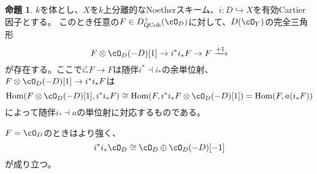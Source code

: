 \documentclass[uplatex, a4paper, dvipdfmx]{jsarticle}
\theoremstyle{definition}
\newtheorem{proposition}[theorem]{命題}
\DeclareMathOperator{\Hom}{\mathrm{Hom}}
\DeclareMathOperator{\QCoh}{\mathrm{QCoh}}
\begin{document}
\begin{proposition}
    $k$を体とし、$X$を$k$上分離的なNoetherスキーム、$i \colon D \hookrightarrow X$を有効Cartier因子とする。
    このとき任意の$F \in D_{\QCoh}^+(\cO_D)$に対して、$D(\cO_Y)$の完全三角形
    \begin{equation}
        F \otimes \cO_D(-D)[1] \to i^*i_*F \to F \xrightarrow{+1}
    \end{equation}
    が存在する。ここで$i^i_*F \to F$は随伴$i^* \dashv i_*$の余単位射、$F \otimes \cO_D(-D)[1] \to i^*i_*F$は
    \begin{equation}
        \Hom(F \otimes \cO_D(-D)[1], i^*i_*F) \cong \Hom(F, i^*i_*F\otimes \cO_D(-D)[1]) = \Hom(F, a(i_*F))
    \end{equation}
    によって随伴$i_* \dashv a$の単位射に対応するものである。

    $F = \cO_D$のときはより強く、
    \begin{equation}
        i^*i_*\cO_D \cong \cO_D \oplus \cO_D(-D)[-1]
    \end{equation}
    が成り立つ。
\end{proposition}
\end{document}
